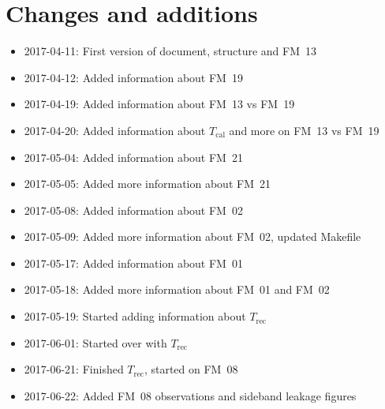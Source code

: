 \chapter{Changes and additions}
\label{ch:changes}

\begin{itemize}
    \item 2017-04-11: First version of document, structure and FM~13
    \item 2017-04-12: Added information about FM~19
    \item 2017-04-19: Added information about FM~13 vs FM~19
    \item 2017-04-20: Added information about $T_\mathrm{cal}$
                      and more on FM~13 vs FM~19
    \item 2017-05-04: Added information about FM~21
    \item 2017-05-05: Added more information about FM~21
    \item 2017-05-08: Added information about FM~02
    \item 2017-05-09: Added more information about FM~02, updated Makefile
    \item 2017-05-17: Added information about FM~01
    \item 2017-05-18: Added more information about FM~01 and FM~02
    \item 2017-05-19: Started adding information about $T_\mathrm{rec}$
    \item 2017-06-01: Started over with $T_\mathrm{rec}$
    \item 2017-06-21: Finished $T_\mathrm{rec}$, started on FM~08
    \item 2017-06-22: Added FM~08 observations and sideband leakage figures
\end{itemize}

